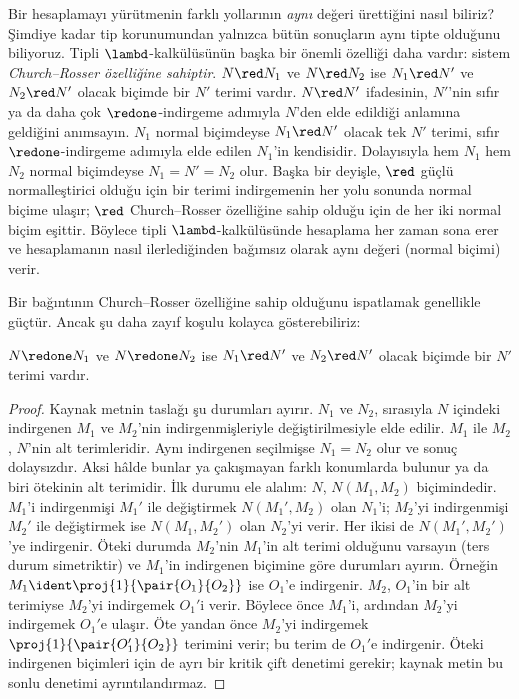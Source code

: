 Bir hesaplamayı yürütmenin farklı yollarının \emph{aynı} değeri ürettiğini
nasıl biliriz? Şimdiye kadar tip korunumundan yalnızca bütün sonuçların aynı
tipte olduğunu biliyoruz. Tipli $\lambd$-kalkülüsünün başka bir önemli
özelliği daha vardır: sistem \emph{Church--Rosser özelliğine sahiptir}.
$N \red N_1$ ve $N \red N_2$ ise $N_1 \red N'$ ve
$N_2 \red N'$ olacak biçimde bir $N'$ terimi vardır. $N \red N'$ ifadesinin,
$N'$'nin sıfır ya da daha çok $\redone$-indirgeme adımıyla $N$'den elde
edildiği anlamına geldiğini anımsayın. $N_1$ normal biçimdeyse $N_1 \red N'$
olacak tek $N'$ terimi, sıfır $\redone$-indirgeme adımıyla elde edilen
$N_1$'in kendisidir. Dolayısıyla hem $N_1$ hem $N_2$ normal biçimdeyse
$N_1=N'=N_2$ olur. Başka bir deyişle, $\red$ güçlü normalleştirici olduğu
için bir terimi indirgemenin her yolu sonunda normal biçime ulaşır;
$\red$ Church--Rosser özelliğine sahip olduğu için de her iki normal biçim
eşittir. Böylece tipli $\lambd$-kalkülüsünde hesaplama her zaman sona erer ve
hesaplamanın nasıl ilerlediğinden bağımsız olarak aynı değeri (normal biçimi)
verir.

Bir bağıntının Church--Rosser özelliğine sahip olduğunu ispatlamak genellikle
güçtür. Ancak şu daha
zayıf koşulu kolayca gösterebiliriz:

\begin{prop}
$N \redone N_1$ ve $N \redone N_2$ ise $N_1 \red N'$ ve $N_2 \red N'$
olacak biçimde bir $N'$ terimi vardır.
\end{prop}

\begin{proof}
  Kaynak metnin taslağı şu durumları ayırır. $N_1$ ve $N_2$, sırasıyla $N$
  içindeki indirgenen $M_1$ ve $M_2$'nin
  indirgenmişleriyle değiştirilmesiyle elde edilir. $M_1$ ile $M_2$, $N$'nin
  alt terimleridir. Aynı indirgenen seçilmişse $N_1=N_2$ olur ve sonuç
  dolaysızdır. Aksi hâlde bunlar ya çakışmayan farklı konumlarda bulunur ya
  da biri ötekinin alt terimidir. İlk durumu ele alalım: $N$, $N(M_1,M_2)$
  biçimindedir. $M_1$'i indirgenmişi $M_1'$ ile değiştirmek
  $N(M_1',M_2)$ olan $N_1$'i; $M_2$'yi indirgenmişi $M_2'$ ile değiştirmek
  ise $N(M_1,M_2')$ olan $N_2$'yi verir. Her ikisi de
  $N(M_1',M_2')$'ye indirgenir. Öteki durumda $M_2$'nin $M_1$'in alt terimi
  olduğunu varsayın (ters durum simetriktir) ve $M_1$'in indirgenen biçimine
  göre durumları ayırın. Örneğin
  $M_1 \ident \proj{1}{\pair{O_1}{O_2}}$ ise $O_1$'e indirgenir. $M_2$,
  $O_1$'in bir alt terimiyse $M_2$'yi indirgemek $O_1'$i verir. Böylece önce
  $M_1$'i, ardından $M_2$'yi indirgemek $O_1'$e ulaşır. Öte yandan önce
  $M_2$'yi indirgemek $\proj{1}{\pair{O_1'}{O_2}}$ terimini verir; bu terim
  de $O_1'$e indirgenir. Öteki indirgenen biçimleri için de ayrı bir kritik
  çift denetimi gerekir; kaynak metin bu sonlu denetimi ayrıntılandırmaz.
\end{proof}

